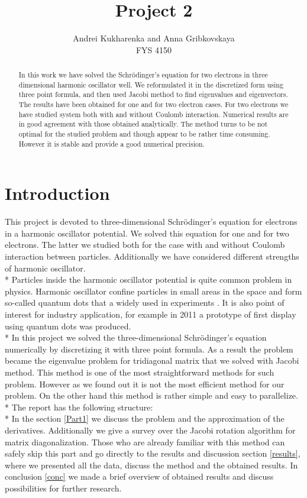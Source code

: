 \documentclass[10pt]{article}
\begin{document}
\setlength\parindent{1pt}
\title{Project 2}
\author{Andrei Kukharenka and Anna Gribkovskaya \\  
FYS 4150 
}

\maketitle
\begin{abstract}
In this work we have solved the Schr\"{o}dinger's equation for two electrons in three dimensional harmonic oscillator well. We reformulated it in the discretized form using three point formula, and then used Jacobi method to find eigenvalues and eigenvectors. The results have been obtained for one and for two electron cases. For two electrons we have studied system both with and without Coulomb interaction. Numerical results are in good agreement with those obtained analytically\cite{three}. The method turns to be not optimal for the studied problem and though appear to be rather time consuming. However it is stable and provide a good numerical precision. 
\end{abstract}
\clearpage 


\section{Introduction}
This project is devoted to three-dimensional Schr\"{o}dinger's equation for electrons in a harmonic oscillator potential. We solved this equation for one and for two electrons. The latter we studied both for the case with and without Coulomb interaction between particles. Additionally we have considered different strengths of harmonic oscillator. \\*
Particles inside the harmonic oscillator potential is quite common problem in physics. Harmonic oscillator confine particles in small areas in the space and form so-called quantum dots that a widely used in experiments \cite{four}. It is also point of interest for industry application, for example in 2011 a prototype of first display using quantum dots was produced\cite{five}. \\*
In this project we solved the three-dimensional Schr\"{o}dinger's equation numerically by discretizing it with three point formula. As a result the problem became the eigenvalue problem for tridiagonal matrix that we solved with Jacobi  method. This method is one of the most straightforward methods for such problem. However as we found out it is not the most efficient method for our problem. On the other hand this method is rather simple and easy to parallelize.\\*
The report has the following structure:\\*
In the section \ref{Part1}  we discuss the problem and the approximation of the derivatives. Additionally we give a survey  over the Jacobi rotation algorithm for matrix diagonalization. Those who are already familiar with this method can safely skip this part and go directly to the results and discussion section \ref{results},  where we presented all the data, discuss the method and the obtained results. In conclusion \ref{conc} we made a brief overview of obtained results and discuss possibilities for further research. 
\end{document}
